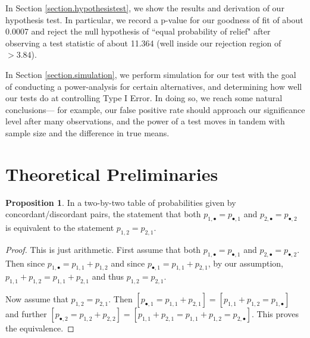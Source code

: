 \documentclass[12pt, letterpaper]{article}
\theoremstyle{definition}
\newtheorem{prop}{Proposition}[theorem]
\numberwithin{equation}{section}
\newcommand{\+}[1]{+_{\scalebox{.375}{#1}}}
\newcommand{\1}{\mathbbm{1}}
\begin{document}
In Section \ref{section.hypothesistest}, we show the results and derivation of our hypothesis test. In particular, we record a p-value for our goodness of fit of about 0.0007 and reject the null hypothesis of ``equal probability of relief" after observing a test statistic of about 11.364 (well inside our rejection region of $>3.84$).
\vspace{\baselineskip}

In Section \ref{section.simulation}, we perform simulation for our test with the goal of conducting a power-analysis for certain alternatives, and determining how well our tests do at controlling Type I Error. In doing so, we reach some natural conclusions--- for example, our false positive rate should approach our significance level after many observations, and the power of a test moves in tandem with sample size and the difference in true means.
\vspace{\baselineskip}







\newpage
\section{Theoretical Preliminaries}\label{section.theory}

\begin{prop}\label{prop.equiv}
	In a two-by-two table of probabilities given by concordant/discordant pairs, the statement that both $p_{1,\bullet}=p_{\bullet, 1}$ and $p_{2,\bullet}=p_{\bullet, 2}$ is equivalent to the statement $p_{1,2}=p_{2,1}$.
	
	\begin{proof}
		This is just arithmetic. First assume that both $p_{1,\bullet}=p_{\bullet, 1}$ and $p_{2,\bullet}=p_{\bullet, 2}$. Then since $p_{1,\bullet}=p_{1,1}+p_{1,2}$ and since $p_{\bullet, 1}=p_{1,1}+p_{2,1}$, by our assumption, $p_{1,1}+p_{1,2}=p_{1,1}+p_{2,1}$ and thus $p_{1,2}=p_{2,1}$.
		\vspace{\baselineskip}
		
		Now assume that $p_{1,2}=p_{2,1}$. Then $\left[p_{\bullet, 1}=p_{1,1}+p_{2,1}\right]=\left[p_{1,1}+p_{1,2}=p_{1, \bullet}\right]$ and further $\left[p_{\bullet, 2}=p_{1,2}+p_{2,2}\right]=\left[p_{1,1}+p_{2,1}=p_{1,1}+p_{1,2}=p_{2,\bullet}\right]$. This proves the equivalence. 
	\end{proof} 
\end{prop}
\end{document}

